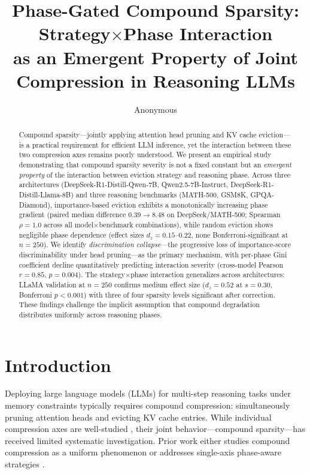 \documentclass[11pt,a4paper]{article}
\title{Phase-Gated Compound Sparsity: Strategy$\times$Phase Interaction\\as an Emergent Property of Joint Compression in Reasoning LLMs}
\author{Anonymous}
\begin{document}
\maketitle

\begin{abstract}
Compound sparsity---jointly applying attention head pruning and KV cache eviction---is a practical requirement for efficient LLM inference, yet the interaction between these two compression axes remains poorly understood. We present an empirical study demonstrating that compound sparsity severity is not a fixed constant but an \emph{emergent property} of the interaction between eviction strategy and reasoning phase. Across three architectures (DeepSeek-R1-Distill-Qwen-7B, Qwen2.5-7B-Instruct, DeepSeek-R1-Distill-Llama-8B) and three reasoning benchmarks (MATH-500, GSM8K, GPQA-Diamond), importance-based eviction exhibits a monotonically increasing phase gradient (paired median difference 0.39$\to$8.48 on DeepSeek/MATH-500; Spearman $\rho=1.0$ across all model$\times$benchmark combinations), while random eviction shows negligible phase dependence (effect sizes $d_z=0.15$--$0.22$, none Bonferroni-significant at $n=250$). We identify \emph{discrimination collapse}---the progressive loss of importance-score discriminability under head pruning---as the primary mechanism, with per-phase Gini coefficient decline quantitatively predicting interaction severity (cross-model Pearson $r=0.85$, $p=0.004$). The strategy$\times$phase interaction generalizes across architectures: LLaMA validation at $n=250$ confirms medium effect size ($d_z=0.52$ at $s=0.30$, Bonferroni $p<0.001$) with three of four sparsity levels significant after correction. These findings challenge the implicit assumption that compound degradation distributes uniformly across reasoning phases.
\end{abstract}

\section{Introduction}

Deploying large language models (LLMs) for multi-step reasoning tasks under memory constraints typically requires compound compression: simultaneously pruning attention heads and evicting KV cache entries. While individual compression axes are well-studied \cite{zhang2024h2o,liu2024scissorhands,ge2024model}, their joint behavior---compound sparsity---has received limited systematic investigation. Prior work either studies compound compression as a uniform phenomenon \cite{spark2024} or addresses single-axis phase-aware strategies \cite{thinkv2025,rkv2025}.
\end{document}
